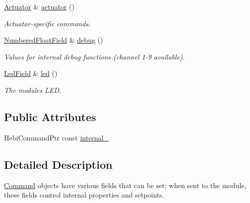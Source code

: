 \begin{DoxyCompactItemize}
\mbox{\label{classhebi_1_1Command_a191430c1056e6cd4566b214342c9c725}} 
\hyperlink{classhebi_1_1Command_1_1Actuator}{Actuator} \& \hyperlink{classhebi_1_1Command_a191430c1056e6cd4566b214342c9c725}{actuator} ()
\begin{DoxyCompactList}\small\item\em Actuator-\/specific commands. \end{DoxyCompactList}\item 
\mbox{\label{classhebi_1_1Command_acbb82c0e3d1d1178abae0ce17e5cb058}} 
\hyperlink{classhebi_1_1Command_1_1NumberedFloatField}{Numbered\+Float\+Field} \& \hyperlink{classhebi_1_1Command_acbb82c0e3d1d1178abae0ce17e5cb058}{debug} ()
\begin{DoxyCompactList}\small\item\em Values for internal debug functions (channel 1-\/9 available). \end{DoxyCompactList}\item 
\mbox{\label{classhebi_1_1Command_ab39389e955b0d9e5a59091fb1db26eeb}} 
\hyperlink{classhebi_1_1Command_1_1LedField}{Led\+Field} \& \hyperlink{classhebi_1_1Command_ab39389e955b0d9e5a59091fb1db26eeb}{led} ()
\begin{DoxyCompactList}\small\item\em The module\textquotesingle{}s L\+ED. \end{DoxyCompactList}\end{DoxyCompactItemize}
\subsection*{Public Attributes}
\begin{DoxyCompactItemize}
\item 
Hebi\+Command\+Ptr const \hyperlink{classhebi_1_1Command_a54791e7ac42129f12d1525df809f3aae}{internal\+\_\+}
\end{DoxyCompactItemize}


\subsection{Detailed Description}
\hyperlink{classhebi_1_1Command}{Command} objects have various fields that can be set; when sent to the module, these fields control internal properties and setpoints. 

